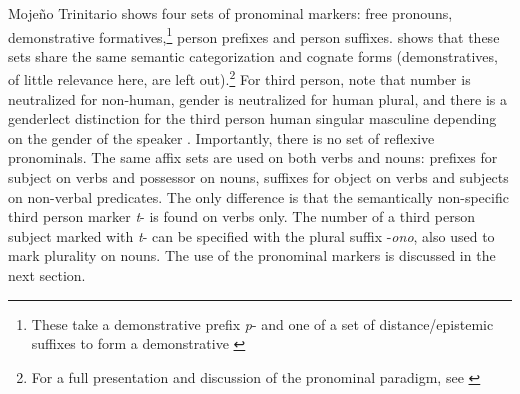 \documentclass[output=paper]{langscibook}
\begin{document}
Mojeño Trinitario shows four sets of pronominal markers: free pronouns, demonstrative formatives,\footnote{These take a demonstrative prefix \textit{p}- and one of a set of distance/epistemic suffixes to form a demonstrative \citep{Rose2017}} person prefixes and person suffixes.  shows that these sets share the same semantic categorization and cognate forms (demonstratives, of little relevance here, are left out).\footnote{For a full presentation and discussion of the pronominal paradigm, see \citet{Rose2015Mojeno}} For third person, note that number is neutralized for non-human, gender is neutralized for human plural, and there is a genderlect distinction for the third person human singular masculine depending on the gender of the speaker \citep{Rose2013, Rose2015Innovative}. Importantly, there is no set of reflexive pronominals. The same affix sets are used on both verbs and nouns: prefixes for subject on verbs and possessor on nouns, suffixes for object on verbs and subjects on non-verbal predicates. The only difference is that the semantically non-specific third person marker \textit{t}- is found on verbs only. The number of a third person subject marked with \textit{t}- can be specified with the plural suffix -\textit{ono}, also used to mark plurality on nouns. The use of the pronominal markers is discussed in the next section.
\end{document}
